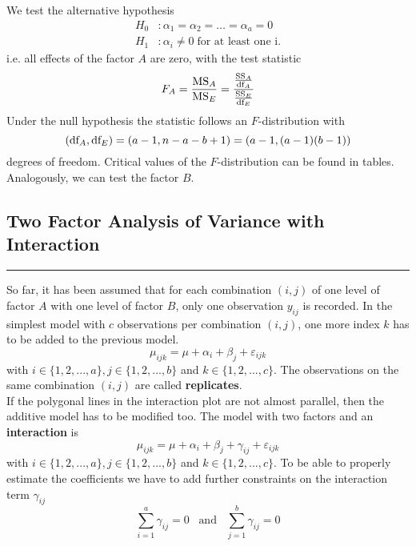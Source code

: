 We test the alternative hypothesis
\begin{equation}
  \begin{split}
    H_0 &: \alpha_1 = \alpha_2 = \dots = \alpha_a = 0\;\\
    H_1 &: \alpha_i \neq 0 \;\text{for at least one i}.
  \end{split}
\end{equation}
i.e. all effects of the factor $A$ are zero, with the test statistic
\begin{equation}
  F_A = \frac{\textup{MS}_A}{\textup{MS}_E} = \frac{\frac{\textup{SS}_A}{\textup{df}_A}}{\frac{\textup{SS}_E}{\textup{df}_E}}
\end{equation}
Under the null hypothesis the statistic follows an $F$-distribution with
\begin{equation}
  \left(\textup{df}_A, \textup{df}_E\right) = (a - 1, n - a - b + 1) = (a - 1,(a - 1)(b - 1))
\end{equation}
degrees of freedom. Critical values of the $F$-distribution can be found in tables. Analogously, we can test the factor $B$.

\subsection{Two Factor Analysis of Variance with Interaction}
\noindent\rule[\linienAbstand]{\linewidth}{\linienDicke}
So far, it has been assumed that for each combination $(i, j)$ of one level of factor $A$ with one level of factor $B$, only one observation $y_{ij}$ is recorded. In the simplest model with $c$ observations per combination $(i, j)$, one more index $k$ has to be added to the previous model.
\begin{equation}
  \mu_{ijk} = \mu + \alpha_i + \beta_j + \varepsilon_{ijk}
\end{equation}
with $i \in \{1, 2, . . . , a\}, j \in \{1, 2, . . . , b\}$ and $k \in \{1, 2, . . . , c\}$. The observations on the same combination $(i, j)$ are called \textbf{replicates}.\\

If the polygonal lines in the interaction plot are not almost parallel, then the additive model has to be modified too. The model with two factors and an \textbf{interaction} is
\begin{equation}
  \mu_{ijk} = \mu + \alpha_i + \beta_j + \gamma_{ij} + \varepsilon_{ijk}
\end{equation}
with $i \in \{1, 2, . . . , a\}, j \in \{1, 2, . . . , b\}$ and $k \in \{1, 2, . . . , c\}$. To be able to properly estimate the coefficients we have to add further constraints on the interaction term $\gamma_{ij}$
\begin{equation}
  \sum_{i=1}^{a} \gamma_{ij} = 0 \;\;\; \text{and} \;\;\; \sum_{j=1}^b \gamma_{ij} = 0
\end{equation}

